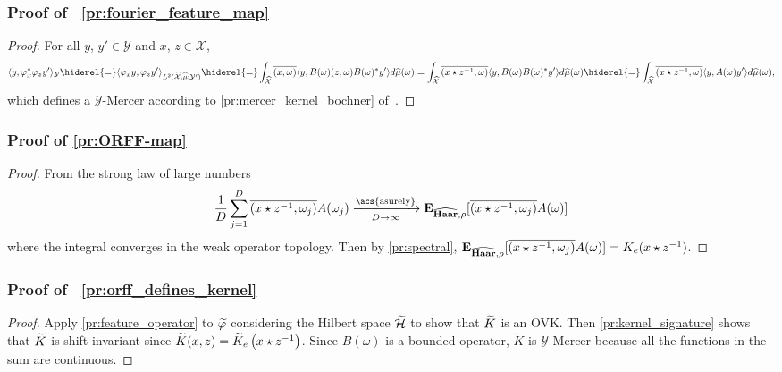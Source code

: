 \subsubsection{Proof of~%
\texorpdfstring{\cref{pr:fourier_feature_map}}{Proposition~%
\ref{pr:fourier_feature_map}}}
\begin{proof}
    For all $y$, $y'\in \mathcal{Y}$ and $x$, $z\in\mathcal{X}$,
    \begin{dmath*}
        \inner{y, \Phi_x^\adjoint \Phi_z y'}_{\mathcal{Y}} \hiderel{=}
        \inner{\Phi_x y, \Phi_z
        y'}_{L^2(\dual{\mathcal{X}},\dual{\mu};\mathcal{Y}')}
        \hiderel{=} \int_{\dual{\mathcal{X}}}\conj{\pairing{x,\omega}}\inner{y,
        B(\omega)\pairing{z,\omega}B(\omega)^\adjoint y'}d\dual{\mu}(\omega)
        = \int_{\dual{\mathcal{X}}}\conj{\pairing{x \groupop
        \myinv{z},\omega}}\inner{y, B(\omega)B(\omega)^\adjoint
        y'}d\dual{\mu}(\omega)
        \hiderel{=} \int_{\dual{\mathcal{X}}}\conj{\pairing{x \groupop
        \inv{z},\omega}}\inner{y,A(\omega)y'}d\dual{\mu}(\omega),
    \end{dmath*}
    which defines a $\mathcal{Y}$-Mercer according to
    \cref{pr:mercer_kernel_bochner} of~\citet{Carmeli2010}.
\end{proof}
\subsubsection{Proof of \texorpdfstring{\cref{pr:ORFF-map}}{Proposition~%
\ref{pr:ORFF-map}}}
\begin{proof}
    From the strong law of large numbers
    \begin{dmath*}
        \frac{1}{D} \sum_{j=1}^D \conj{\pairing{x\groupop\inv{z},\omega_j}}
        A(\omega_j) \converges{\acs{asurely}}{D \to \infty}
        \expectation_{\dual{\Haar}, \rho}[\conj{\pairing{x \groupop z^{-1},
        \omega_j} }A(\omega)]
    \end{dmath*}
    where the integral converges in the weak operator topology. Then by
    \cref{pr:spectral}, ${\mathbf{{E}}}_{\widehat{\mathbf{Haar}}, \rho}[\overline{(x
    \star z^{-1}, \omega_j)}A(\omega)] =K_e(x\star{z}^{-1})$.
\end{proof}
\subsubsection{Proof of~%
\texorpdfstring{\cref{pr:orff_defines_kernel}}{Proposition~%
\ref{pr:orff_defines_kernel}}}
\begin{proof}
    Apply \cref{pr:feature_operator} to $\tildePhi{\omega}$ considering the
    Hilbert space $\widetilde{\mathcal{H}}$ to show that $\widetilde{K}$ is an
    \acs{OVK}. Then \cref{pr:kernel_signature} shows that $\widetilde{K}$ is
    shift-invariant since
    $\widetilde{K}(x,z)=\widetilde{K}_e\left(x\star z^{-1}\right)$.
    Since $B(\omega)$ is a bounded operator, $\widetilde{K}$ is
    $\mathcal{Y}$-Mercer because all the functions in the sum are continuous.
\end{proof}
